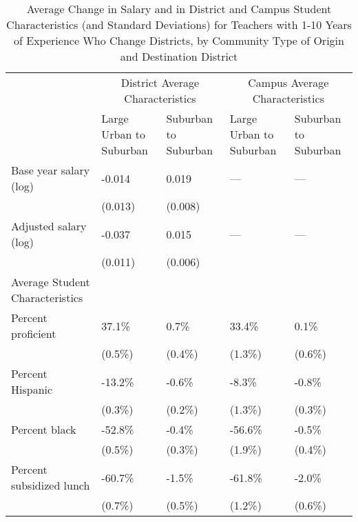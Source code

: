 \documentclass[]{article}
\begin{document}
\begin{table}[ht]
\centering
\begin{tabular}{lp{}p{}p{}p{}}
  \hline
 & \multicolumn{2}{c}{District Average Characteristics} & \multicolumn{2}{c}{Campus Average Characteristics}\\ \cline{2-5}
 & Large Urban to Suburban & Suburban to Suburban & Large Urban to Suburban & Suburban to Suburban \\
  \hline
Base year salary (log) & -0.014 & 0.019 & --- & --- \\ 
   & (0.013) & (0.008) &  &  \\ 
  Adjusted salary (log) & -0.037 & 0.015 & --- & --- \\ 
   & (0.011) & (0.006) &  &  \\ 
Average Student Characteristics & & & & \\
  \quad Percent proficient & 37.1\% & 0.7\% & 33.4\% & 0.1\% \\ 
   & (0.5\%) & (0.4\%) & (1.3\%) & (0.6\%) \\ 
  \quad Percent Hispanic & -13.2\% & -0.6\% & -8.3\% & -0.8\% \\ 
   & (0.3\%) & (0.2\%) & (1.3\%) & (0.3\%) \\ 
  \quad Percent black & -52.8\% & -0.4\% & -56.6\% & -0.5\% \\ 
   & (0.5\%) & (0.3\%) & (1.9\%) & (0.4\%) \\ 
  \quad Percent subsidized lunch & -60.7\% & -1.5\% & -61.8\% & -2.0\% \\ 
   & (0.7\%) & (0.5\%) & (1.2\%) & (0.6\%) \\ 
   \hline
\end{tabular}
\caption{Average Change in Salary and in District and Campus Student Characteristics (and Standard Deviations) for Teachers with 1-10 Years of Experience Who Change Districts, by Community Type of Origin and Destination District} 
\label{tbl:change_by_urb}
\end{table}
\end{document}
